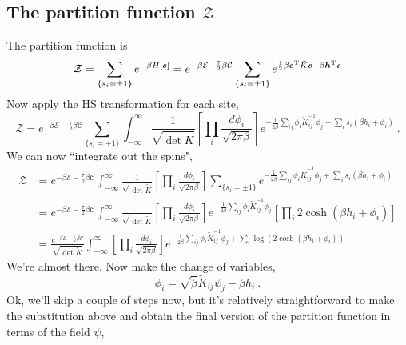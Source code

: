 \documentclass[11pt]{article}
\begin{document}
\subsection{The partition function $\mathcal{Z}$}
The partition function is
\begin{equation}
\mathcal{Z}=\sum_{\{s_i=\pm 1\}}e^{-\beta H[\bm s]}=e^{-\beta\mathcal{E}-\frac{7}{2}\beta\mathcal{C}}
\sum_{\{s_i=\pm 1\}}e^{\frac{1}{2}\beta\bm s^{\rm T}\tilde K\bm s+\beta\bm h^{\rm T}\bm s}
\end{equation}
Now apply the HS transformation for each site,
\begin{equation}
\mathcal{Z}=e^{-\beta\mathcal{E}-\frac{7}{2}\beta\mathcal{C}}
\sum_{\{s_i=\pm 1\}}\int_{-\infty}^{\infty} \frac{1}{\sqrt{\operatorname{det} \tilde{K}}}\left[\prod_{i} \frac{d \phi_{i}}{\sqrt{2 \pi \beta}}\right] e^{-\frac{1}{2 \beta} \sum_{i j} \phi_{i} \tilde{K}_{i j}^{-1} \phi_{j}+\sum_{i} s_{i}\left(\beta h_i+\phi_{i}\right)}\ .
\end{equation}
We can now ``integrate out the spins",
\begin{align}
\mathcal{Z}&=e^{-\beta\mathcal{E}-\frac{7}{2}\beta\mathcal{C}}
\int_{-\infty}^{\infty} \frac{1}{\sqrt{\operatorname{det} \tilde{K}}}\left[\prod_{i} \frac{d \phi_{i}}{\sqrt{2 \pi \beta}}\right] \sum_{\{s_i=\pm 1\}}e^{-\frac{1}{2 \beta} \sum_{i j} \phi_{i} \tilde{K}_{i j}^{-1} \phi_{j}+\sum_{i} s_{i}\left(\beta h_i+\phi_{i}\right)}\\
&=e^{-\beta\mathcal{E}-\frac{7}{2}\beta\mathcal{C}}
\int_{-\infty}^{\infty} \frac{1}{\sqrt{\operatorname{det} \tilde{K}}}\left[\prod_{i} \frac{d \phi_{i}}{\sqrt{2 \pi \beta}}\right] e^{-\frac{1}{2 \beta} \sum_{i j} \phi_{i} \tilde{K}_{i j}^{-1} \phi_{j}}\left[\prod_i 2\cosh\left(\beta h_i+\phi_{i}\right)\right]\\ 
&=\frac{e^{-\beta\mathcal{E}-\frac{7}{2}\beta\mathcal{C}}}{\sqrt{\operatorname{det} \tilde{K}}}
\int_{-\infty}^{\infty}\left[\prod_{i} \frac{d \phi_{i}}{\sqrt{2 \pi \beta}}\right] e^{-\frac{1}{2 \beta} \sum_{i j} \phi_{i} \tilde{K}_{i j}^{-1} \phi_{j}+\sum_i\log\left(2\cosh\left(\beta h_i+\phi_{i}\right)\right)}\
\end{align}
We're almost there.  Now make the change of variables,
\begin{equation}
\phi_{i}=\sqrt{\beta}\tilde{K}_{i j} \psi_{j}-\beta h_{i}\ .
\end{equation}
Ok, we'll skip a couple of steps now, but it's relatively straightforward to make the substitution above and obtain the final version of the partition function in terms of the field $\psi$,
\end{document}
